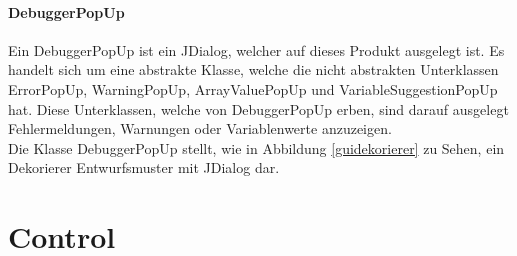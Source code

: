 \documentclass[parskip=full]{scrartcl}
\begin{document}
\paragraph{DebuggerPopUp}
Ein DebuggerPopUp ist ein JDialog, welcher auf dieses Produkt ausgelegt ist. Es handelt sich um eine abstrakte Klasse, welche die nicht abstrakten Unterklassen ErrorPopUp, WarningPopUp, ArrayValuePopUp und VariableSuggestionPopUp hat. Diese Unterklassen, welche von DebuggerPopUp erben, sind darauf ausgelegt Fehlermeldungen, Warnungen oder Variablenwerte anzuzeigen. \\ 
Die Klasse DebuggerPopUp stellt, wie in Abbildung \ref{guidekorierer} zu Sehen, ein Dekorierer Entwurfsmuster mit JDialog dar.


\section{Control}
\end{document}
